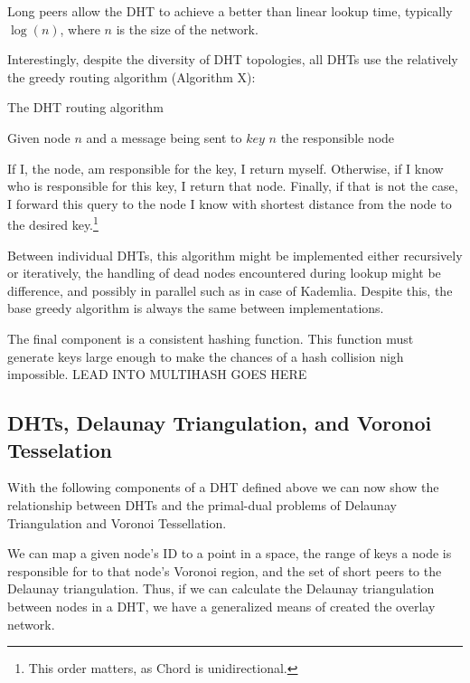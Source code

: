 \documentclass[11pt,conference]{IEEEtran}
\begin{document}
Long peers allow the DHT to achieve a better than linear lookup time, typically $ \log(n) $, where $n$ is the size of the network. 

Interestingly, despite the diversity of DHT topologies, all DHTs use the relatively the greedy routing algorithm (Algorithm X):

\begin{algorithm}
	\caption{The DHT routing algorithm}
	\label{alg:routing}
	\begin{algorithmic}[1]
		\STATE Given node $n$ and a message being sent to $key$
			\RETURN $ n $
		\ENDIF
			\RETURN the responsible node
		\ENDIF
	\end{algorithmic}
	
	\scriptsize
\end{algorithm}
If I, the node, am responsible for the key, I return myself.
Otherwise, if I know who is responsible for this key, I return that node.
Finally, if that is not the case, I forward this query to the node I know with shortest distance from the node to the desired key.\footnote{This order matters, as Chord is unidirectional.} 

Between individual DHTs, this algorithm might be implemented either recursively or iteratively, the handling of dead nodes encountered during lookup might be difference, and possibly in parallel such as in case of Kademlia.
Despite this, the base greedy algorithm is always the same between implementations.

The final component is a consistent hashing function.
This function must generate keys large enough to make the chances of a hash collision nigh impossible.
LEAD INTO MULTIHASH GOES HERE

\subsection{DHTs, Delaunay Triangulation, and Voronoi Tesselation}
With the following components of a DHT defined above we can now show the relationship between DHTs and the primal-dual problems of Delaunay Triangulation and Voronoi Tessellation.


We can map a given node's ID to a point in a space, the range of keys a node is responsible for to that node's Voronoi region, and the set of short peers to the Delaunay triangulation.
Thus, if we can calculate the Delaunay triangulation between nodes in a DHT, we have a generalized means of created the overlay network.
\end{document}
